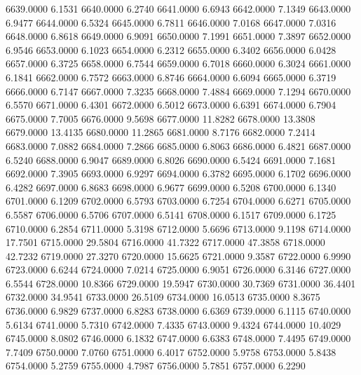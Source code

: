 6639.0000      6.1531
6640.0000      6.2740
6641.0000      6.6943
6642.0000      7.1349
6643.0000      6.9477
6644.0000      6.5324
6645.0000      6.7811
6646.0000      7.0168
6647.0000      7.0316
6648.0000      6.8618
6649.0000      6.9091
6650.0000      7.1991
6651.0000      7.3897
6652.0000      6.9546
6653.0000      6.1023
6654.0000      6.2312
6655.0000      6.3402
6656.0000      6.0428
6657.0000      6.3725
6658.0000      6.7544
6659.0000      6.7018
6660.0000      6.3024
6661.0000      6.1841
6662.0000      6.7572
6663.0000      6.8746
6664.0000      6.6094
6665.0000      6.3719
6666.0000      6.7147
6667.0000      7.3235
6668.0000      7.4884
6669.0000      7.1294
6670.0000      6.5570
6671.0000      6.4301
6672.0000      6.5012
6673.0000      6.6391
6674.0000      6.7904
6675.0000      7.7005
6676.0000      9.5698
6677.0000     11.8282
6678.0000     13.3808
6679.0000     13.4135
6680.0000     11.2865
6681.0000      8.7176
6682.0000      7.2414
6683.0000      7.0882
6684.0000      7.2866
6685.0000      6.8063
6686.0000      6.4821
6687.0000      6.5240
6688.0000      6.9047
6689.0000      6.8026
6690.0000      6.5424
6691.0000      7.1681
6692.0000      7.3905
6693.0000      6.9297
6694.0000      6.3782
6695.0000      6.1702
6696.0000      6.4282
6697.0000      6.8683
6698.0000      6.9677
6699.0000      6.5208
6700.0000      6.1340
6701.0000      6.1209
6702.0000      6.5793
6703.0000      6.7254
6704.0000      6.6271
6705.0000      6.5587
6706.0000      6.5706
6707.0000      6.5141
6708.0000      6.1517
6709.0000      6.1725
6710.0000      6.2854
6711.0000      5.3198
6712.0000      5.6696
6713.0000      9.1198
6714.0000     17.7501
6715.0000     29.5804
6716.0000     41.7322
6717.0000     47.3858
6718.0000     42.7232
6719.0000     27.3270
6720.0000     15.6625
6721.0000      9.3587
6722.0000      6.9990
6723.0000      6.6244
6724.0000      7.0214
6725.0000      6.9051
6726.0000      6.3146
6727.0000      6.5544
6728.0000     10.8366
6729.0000     19.5947
6730.0000     30.7369
6731.0000     36.4401
6732.0000     34.9541
6733.0000     26.5109
6734.0000     16.0513
6735.0000      8.3675
6736.0000      6.9829
6737.0000      6.8283
6738.0000      6.6369
6739.0000      6.1115
6740.0000      5.6134
6741.0000      5.7310
6742.0000      7.4335
6743.0000      9.4324
6744.0000     10.4029
6745.0000      8.0802
6746.0000      6.1832
6747.0000      6.6383
6748.0000      7.4495
6749.0000      7.7409
6750.0000      7.0760
6751.0000      6.4017
6752.0000      5.9758
6753.0000      5.8438
6754.0000      5.2759
6755.0000      4.7987
6756.0000      5.7851
6757.0000      6.2290
